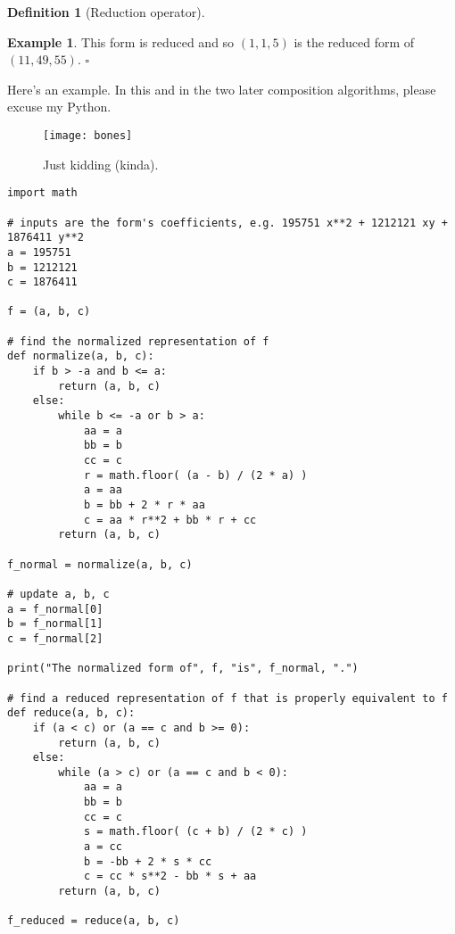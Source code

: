 \documentclass{article}
\theoremstyle{definition}
\newtheorem{definition}{Definition}[section]
\theoremstyle{theorem}
\theoremstyle{example}
\newtheorem{example}{Example}[section]
\theoremstyle{corollary}
\begin{document}
\begin{definition}[Reduction operator]
\begin{example}
\bigskip

This form is reduced and so \((1, 1, 5)\) is the reduced form of \((11, 49, 55)\). \(\square\)

\end{example}

\pagebreak

Here's an example. In this and in the two later composition algorithms, please excuse my Python.

\bigskip

\begin{figure}[H]
\centering
\texttt{[image: bones]}
\caption{Just kidding (kinda).}
\end{figure}









\bigskip

\hline

\bigskip

\begin{verbatim}
import math

# inputs are the form's coefficients, e.g. 195751 x**2 + 1212121 xy + 1876411 y**2
a = 195751
b = 1212121
c = 1876411

f = (a, b, c)

# find the normalized representation of f
def normalize(a, b, c):
    if b > -a and b <= a:
        return (a, b, c)
    else:
        while b <= -a or b > a:
            aa = a
            bb = b
            cc = c
            r = math.floor( (a - b) / (2 * a) )
            a = aa
            b = bb + 2 * r * aa
            c = aa * r**2 + bb * r + cc
        return (a, b, c)

f_normal = normalize(a, b, c)

# update a, b, c
a = f_normal[0]
b = f_normal[1]
c = f_normal[2]

print("The normalized form of", f, "is", f_normal, ".")

# find a reduced representation of f that is properly equivalent to f
def reduce(a, b, c):
    if (a < c) or (a == c and b >= 0):
        return (a, b, c)
    else:
        while (a > c) or (a == c and b < 0):
            aa = a
            bb = b
            cc = c
            s = math.floor( (c + b) / (2 * c) )
            a = cc
            b = -bb + 2 * s * cc
            c = cc * s**2 - bb * s + aa
        return (a, b, c)

f_reduced = reduce(a, b, c)


\end{verbatim}
\end{definition}
\end{document}

